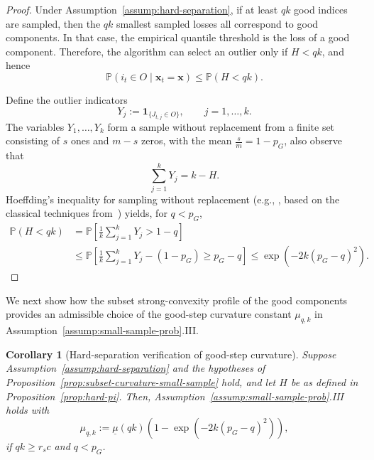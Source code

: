 \documentclass[11pt]{article}
\newcommand{\ve}[1]{\mathbf{#1}}
\newtheorem{cor}{Corollary}
\begin{document}
\begin{proof}
Under Assumption~\ref{assump:hard-separation}, if at least \(qk\) good
indices are sampled, then the \(qk\) smallest sampled losses all correspond
to good components. In that case, the empirical quantile threshold is the
loss of a good component.
Therefore, the algorithm can select an outlier only if \(H<qk\), and hence
\[
\mathbb{P}(i_t\in O\mid \ve{x}_t=\ve{x})
\le
\mathbb{P}(H<qk).
\]

Define the outlier indicators
\[
Y_j:=
\mathbf{1}_{\{J_{t,j}\in O\}},
\qquad j=1,\ldots,k.
\]
The variables \(Y_1,\ldots,Y_k\) form a sample without replacement from a finite
set consisting of \(s\) ones and \(m-s\) zeros, with the  mean $
\frac{s}{m}=1-p_G$,
also observe that
\[
\sum_{j=1}^k Y_j=k-H.
\]
Hoeffding's inequality for sampling without replacement (e.g., \cite[Proposition~1.2]{bardenet2015concentration}, based on the classical techniques from~\cite{hoeffding1963probability}) yields, for \(q<p_G\),
\begin{align*}
\mathbb{P}(H<qk)
&=
\mathbb{P}\left[
\frac{1}{k}\sum_{j=1}^k Y_j>1-q
\right]\\
&\le
\mathbb{P}\left[
\frac{1}{k}\sum_{j=1}^k Y_j-(1-p_G)
\ge p_G-q
\right] \le
\exp\left(-2k(p_G-q)^2\right).
\end{align*}
\end{proof}


We next show how the subset strong-convexity profile of the good components
provides an admissible choice of the good-step curvature constant
\(\mu_{q,k}\) in Assumption~\ref{assump:small-sample-prob}.III.

\begin{cor}[Hard-separation verification of good-step curvature]
\label{cor:mu-lower-hard}
Suppose Assumption~\ref{assump:hard-separation} and the hypotheses of
Proposition~\ref{prop:subset-curvature-small-sample} hold, and let \(H\)
be as defined in Proposition~\ref{prop:hard-pi}. Then, Assumption~\ref{assump:small-sample-prob}.III holds with
\[
\mu_{q,k}
:=
\underline{\mu}(qk)
\left(1-\exp\left(-2k(p_G-q)^2\right)\right),
\]
if $qk \ge r_sc$ and $q < p_G$.
\end{cor}
\end{document}
